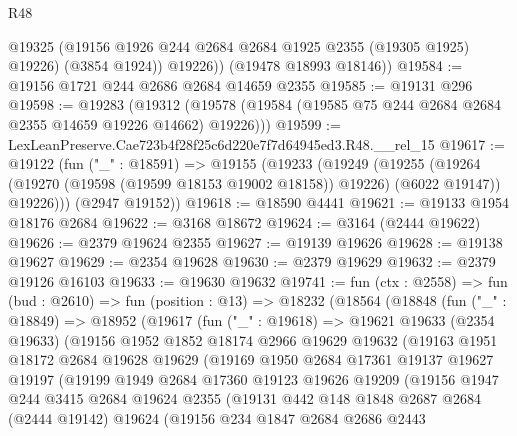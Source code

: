 \begin{lexlean}{R48}
\begin{coremodule}
            @19325
            (@19156 @1926 @244 @2684 @2684 @1925 @2355 (@19305 @1925) @19226)
            (@3854 @1924))
          @19226))
      (@19478 @18993 @18146))
@19584 := @19156 @1721 @244 @2686 @2684 @14659 @2355
@19585 := @19131 @296
@19598 := @19283
    (@19312 (@19578 (@19584 (@19585 @75 @244 @2684 @2684 @2355 @14659 @19226 @14662) @19226)))
@19599 := LexLeanPreserve.Cae723b4f28f25c6d220e7f7d64945ed3.R48.__rel_15
@19617 := @19122
    (fun ("_" : @18591) =>
    @19155
      (@19233
        (@19249
          (@19255
            (@19264 (@19270 (@19598 (@19599 @18153 @19002 @18158)) @19226) (@6022 @19147))
            @19226)))
      (@2947 @19152))
@19618 := @18590 @4441
@19621 := @19133 @1954 @18176 @2684
@19622 := @3168 @18672
@19624 := @3164 (@2444 @19622)
@19626 := @2379 @19624 @2355
@19627 := @19139 @19626
@19628 := @19138 @19627
@19629 := @2354 @19628
@19630 := @2379 @19629
@19632 := @2379 @19126 @16103
@19633 := @19630 @19632
@19741 := fun (ctx : @2558) =>
  fun (bud : @2610) =>
  fun (position : @13) =>
  @18232
    (@18564
      (@18848
        (fun ("_" : @18849) =>
        @18952
          (@19617
            (fun ("_" : @19618) =>
            @19621
              @19633
              (@2354 @19633)
              (@19156
                @1952
                @1852
                @18174
                @2966
                @19629
                @19632
                (@19163
                  @1951
                  @18172
                  @2684
                  @19628
                  @19629
                  (@19169
                    @1950
                    @2684
                    @17361
                    @19137
                    @19627
                    @19197
                    (@19199
                      @1949
                      @2684
                      @17360
                      @19123
                      @19626
                      @19209
                      (@19156
                        @1947
                        @244
                        @3415
                        @2684
                        @19624
                        @2355
                        (@19131
                          @442
                          @148
                          @1848
                          @2687
                          @2684
                          (@2444 @19142)
                          @19624
                          (@19156
                            @234
                            @1847
                            @2684
                            @2686
                            @2443

\end{coremodule}
\end{lexlean}
